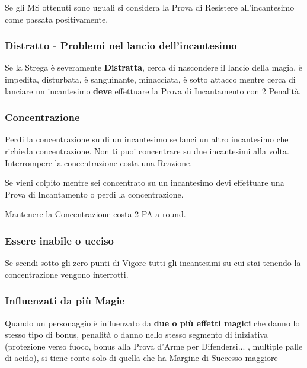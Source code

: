 \documentclass[12pt,a4paper,twoside,openany]{book}
\begin{document}
\begin{multicols}{2}
Se gli MS ottenuti sono uguali si considera la Prova di Resistere all'incantesimo come passata positivamente.

\subsubsection{Distratto - Problemi nel lancio dell'incantesimo}\label{magiedistratto}

Se la Strega è severamente \textbf{Distratta}, cerca di nascondere il lancio della magia, è impedita, disturbata, è sanguinante, minacciata, è sotto attacco mentre cerca di lanciare un incantesimo \textbf{deve} effettuare la Prova di Incantamento con 2 Penalità.

\subsubsection{Concentrazione}\label{magieconcentrazione}

Perdi la concentrazione su di un incantesimo se lanci un altro incantesimo che richieda concentrazione. Non ti puoi concentrare su due incantesimi alla volta. Interrompere la concentrazione costa una Reazione.

Se vieni colpito mentre sei concentrato su un incantesimo devi effettuare una Prova di Incantamento o perdi la concentrazione.

Mantenere la Concentrazione costa 2 PA a round.

\subsubsection{Essere inabile o ucciso}\label{magieessereucciso}

Se scendi sotto gli zero punti di Vigore tutti gli incantesimi su cui stai tenendo la concentrazione vengono interrotti.


\subsubsection{Influenzati da più Magie}\label{magieinfluenzatodapiumagie}

Quando un personaggio è influenzato da \textbf{due o più effetti magici} che danno lo stesso tipo di bonus, penalità o danno nello stesso segmento di iniziativa (protezione verso fuoco, bonus alla Prova d'Arme per Difendersi... , multiple palle di acido), si tiene conto solo di quella che ha Margine di Successo maggiore


\end{multicols}
\end{document}
